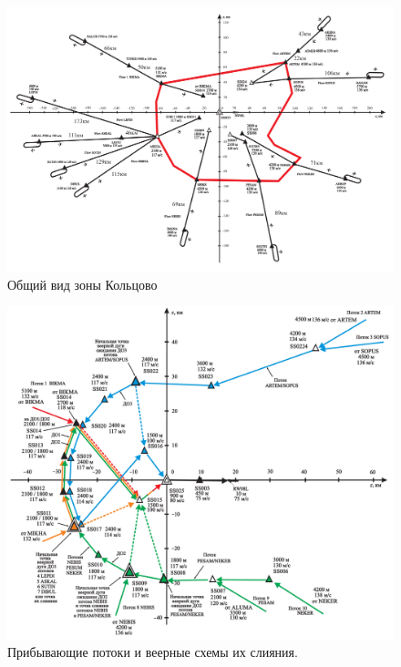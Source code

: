 \documentclass[12pt]{article}
\theoremstyle{plain}
\begin{document}
\begin{figure}[h]
  \begin{center}
      \includegraphics[scale=0.25]{Koltsovo01.png}
        \caption{Общий вид зоны Кольцово}                                                                             
    \label{KoltsAll}
  \end{center}
\end{figure}

\begin{figure}[h]
  \begin{center}
      \includegraphics[scale=0.25]{Koltsovo02.png}
        \caption{Прибывающие потоки и веерные схемы их слияния.}                                                                             
    \label{KoltsLand} 
  \end{center}
\end{figure}
\end{document}
